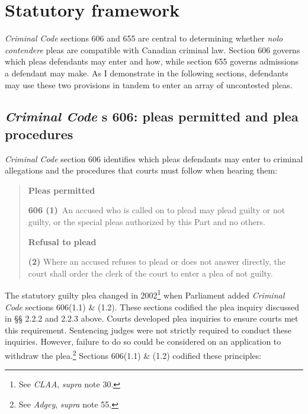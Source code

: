 \section{Statutory framework}

\textit{Criminal Code} sections 606 and 655 are central to determining whether \textit{nolo contendere} pleas are compatible with Canadian criminal law. Section 606 governs which pleas defendants may enter and how, while section 655 governs admissions a defendant may make. As I demonstrate in the following sections, defendants may use these two provisions in tandem to enter an array of uncontested pleas.

\subsection{\textit{Criminal Code} s 606: pleas permitted and plea procedures}

\textit{Criminal Code} section 606 identifies which pleas defendants may enter to criminal allegations and the procedures that courts must follow when hearing them:

\begin{quote}
    \onehalfspacing
    \textbf{Pleas permitted}
    
    \textbf{606 (1)} An accused who is called on to plead may plead guilty or not guilty, or the special pleas authorized by this Part and no others.\medskip

    \textbf{Refusal to plead}
    
    \textbf{(2)} Where an accused refuses to plead or does not answer directly, the court shall order the clerk of the court to enter a plea of not guilty.
    
\end{quote}
The statutory guilty plea changed in 2002\footnote{See \textit{CLAA}, \textit{supra} note 30.} when Parliament added \textit{Criminal Code} sections 606(1.1) \& (1.2). These sections codified the plea inquiry discussed in §§ 2.2.2 and 2.2.3 above. Courts developed plea inquiries to ensure courts met this requirement. Sentencing judges were not strictly required to conduct these inquiries. However, failure to do so could be considered on an application to withdraw the plea.\footnote{See \textit{Adgey}, \textit{supra} note 55.} Sections 606(1.1) \& (1.2) codified these principles:

